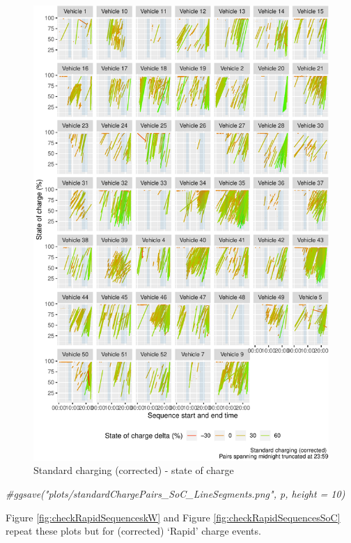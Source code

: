 \documentclass[]{article}
\newenvironment{Shaded}{\begin{snugshade}}{\end{snugshade}}
\newcommand{\CommentTok}[1]{\textcolor[rgb]{0.56,0.35,0.01}{\textit{#1}}}
\begin{document}
\begin{figure}
\centering
\includegraphics{EVBB_report_v1_files/figure-latex/checkStdSequencesSoC-1.pdf}
\caption{\label{fig:checkStdSequencesSoC}Standard charging (corrected) - state of charge}
\end{figure}

\begin{Shaded}
\begin{Highlighting}[]
\CommentTok{#ggsave("plots/standardChargePairs_SoC_LineSegments.png", p, height = 10)}
\end{Highlighting}
\end{Shaded}

Figure \ref{fig:checkRapidSequenceskW} and Figure \ref{fig:checkRapidSequencesSoC} repeat these plots but for (corrected) `Rapid' charge events.
\end{document}
